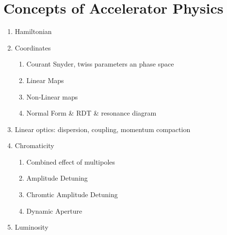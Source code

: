 \chapter{Concepts of Accelerator Physics}
\thumbforchapter{}
\chaptertoc{}
\newpage

\begin{enumerate}
    \tightlist
    \color{red}
    \item Hamiltonian
    \item Coordinates
    \begin{enumerate}
    \tightlist
        \item Courant Snyder, twiss parameters an phase space
        \item Linear Maps
        \item Non-Linear maps
        \item Normal Form \& RDT \& resonance diagram
    \end{enumerate}
    \item Linear optics: dispersion, coupling, momentum compaction
    \item Chromaticity

    \begin{enumerate}
    \tightlist
        \item Combined effect of multipoles
        \item Amplitude Detuning
        \item Chromtic Amplitude Detuning
        \item Dynamic Aperture
    \end{enumerate}
    \item Luminosity
\end{enumerate}







